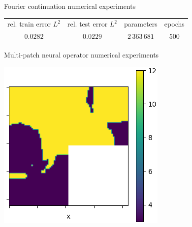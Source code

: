 \documentclass{beamer}
\begin{document}
\begin{frame}{Fourier continuation numerical experiments}
\begin{center}
\begin{minipage}{0.24\textwidth}
        \end{minipage}
    \end{center}
	\begin{table}[h!] %
		\centering
		\begin{tabular}{cccc}\toprule
		rel. train error $ L^2 $ & rel. test error $L^2$ & parameters & epochs \\
			\cmidrule{1-4}
			$ 0.0282 $ & $0.0229$ & $ 2\, 363\, 681 $ & $500$ \\
			\bottomrule
		\end{tabular}
	\end{table}
\end{frame}


\begin{frame}{Multi-patch neural operator numerical experiments}
	\begin{center}
        \begin{minipage}{0.24\textwidth}
            \includegraphics[width=\textwidth]{MPNO_input.png}
        \end{minipage}
        \hfill
        \begin{minipage}{0.24\textwidth}

\end{minipage}
\end{center}
\end{frame}
\end{document}
